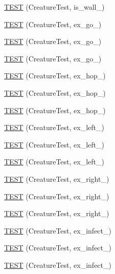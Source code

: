 \begin{DoxyCompactItemize}
\hyperlink{TestDarwin_8c_09_09_ac37845a54ae55747c921c02d61e600c7}{T\-E\-S\-T} (Creature\-Test, is\-\_\-wall\-\_)
\item 
\hyperlink{TestDarwin_8c_09_09_a554bbca6a8202084c171927f8336748e}{T\-E\-S\-T} (Creature\-Test, ex\-\_\-go\-\_)
\item 
\hyperlink{TestDarwin_8c_09_09_a13a24c0311d8d5791f19006ef4242eb4}{T\-E\-S\-T} (Creature\-Test, ex\-\_\-go\-\_)
\item 
\hyperlink{TestDarwin_8c_09_09_a9733a48230f4f095adfdbee72c43fec5}{T\-E\-S\-T} (Creature\-Test, ex\-\_\-go\-\_)
\item 
\hyperlink{TestDarwin_8c_09_09_a68974512da820facde29cb2b577382d8}{T\-E\-S\-T} (Creature\-Test, ex\-\_\-hop\-\_)
\item 
\hyperlink{TestDarwin_8c_09_09_abbe416d05d5c286213d40d411f560e2d}{T\-E\-S\-T} (Creature\-Test, ex\-\_\-hop\-\_)
\item 
\hyperlink{TestDarwin_8c_09_09_a97d00f74bd422d4f353a008dd07f8aab}{T\-E\-S\-T} (Creature\-Test, ex\-\_\-hop\-\_)
\item 
\hyperlink{TestDarwin_8c_09_09_a7485d126cbc068f75c594fee958680cf}{T\-E\-S\-T} (Creature\-Test, ex\-\_\-left\-\_)
\item 
\hyperlink{TestDarwin_8c_09_09_a84383f9a97403e54dae878117c1c253f}{T\-E\-S\-T} (Creature\-Test, ex\-\_\-left\-\_)
\item 
\hyperlink{TestDarwin_8c_09_09_acf0b657ae4aa25a23fcd86b3c205f254}{T\-E\-S\-T} (Creature\-Test, ex\-\_\-left\-\_)
\item 
\hyperlink{TestDarwin_8c_09_09_ae7fbc47d193413129df9f2bfc65a4a76}{T\-E\-S\-T} (Creature\-Test, ex\-\_\-right\-\_)
\item 
\hyperlink{TestDarwin_8c_09_09_adeef9eb4824ff7e6cc2775bd7fb9cee0}{T\-E\-S\-T} (Creature\-Test, ex\-\_\-right\-\_)
\item 
\hyperlink{TestDarwin_8c_09_09_aed626b60acd21621a3ed5ff032c837b9}{T\-E\-S\-T} (Creature\-Test, ex\-\_\-right\-\_)
\item 
\hyperlink{TestDarwin_8c_09_09_a4dba4b9efe4cbc5e57b48e818c997a11}{T\-E\-S\-T} (Creature\-Test, ex\-\_\-infect\-\_)
\item 
\hyperlink{TestDarwin_8c_09_09_a207c4f74117968732fb6a82bdf4a71a8}{T\-E\-S\-T} (Creature\-Test, ex\-\_\-infect\-\_)
\item 
\hyperlink{TestDarwin_8c_09_09_aca313dcc90fc41f5b493739614e5775c}{T\-E\-S\-T} (Creature\-Test, ex\-\_\-infect\-\_)
\item 

\end{DoxyCompactItemize}

